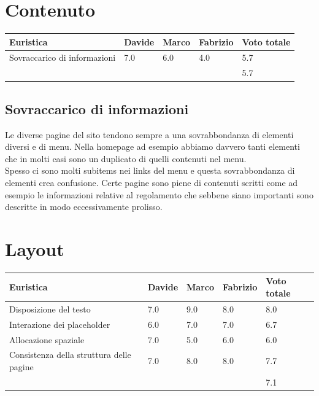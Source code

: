     \section{Contenuto}
    \begin{table}[H]
        \begin{tabular}{|l|l|l|l|l|}
        \hline \textbf{Euristica} & \textbf{Davide} & \textbf{Marco} &
        \textbf{Fabrizio} & \textbf{Voto totale} \\ \hline
        Sovraccarico di informazioni    & 7.0   & 6.0   & 4.0   & 5.7 \\ \hline
                                        &       &       &       & 5.7 \\ \hline
        \end{tabular}
        \end{table}
        \subsection{Sovraccarico di informazioni}
        Le diverse pagine del sito tendono sempre a una sovrabbondanza di
        elementi diversi e di menu. Nella homepage ad esempio abbiamo davvero
        tanti elementi che in molti casi sono un duplicato di quelli contenuti
        nel menu.\\ Spesso ci sono molti subitems nei links del menu e questa
        sovrabbondanza di elementi crea confusione. Certe pagine sono piene di
        contenuti scritti come ad esempio le informazioni relative al
        regolamento che sebbene siano importanti sono descritte in modo
        eccessivamente prolisso.

    \pagebreak
    \section{Layout}
        \begin{table}[H]
        \begin{tabular}{|l|l|l|l|l|}
        \hline \textbf{Euristica} & \textbf{Davide} & \textbf{Marco} &
        \textbf{Fabrizio} & \textbf{Voto totale} \\ \hline
        Disposizione del testo                      & 7.0   & 9.0   & 8.0   & 8.0 \\ \hline
        Interazione dei placeholder                 & 6.0   & 7.0   & 7.0   & 6.7 \\ \hline
        Allocazione spaziale                        & 7.0   & 5.0   & 6.0   & 6.0 \\ \hline
        Consistenza della struttura delle pagine    & 7.0   & 8.0   & 8.0   & 7.7 \\ \hline
                                                    &       &       &       & 7.1 \\ 
        \hline
        \end{tabular}
        \end{table}
